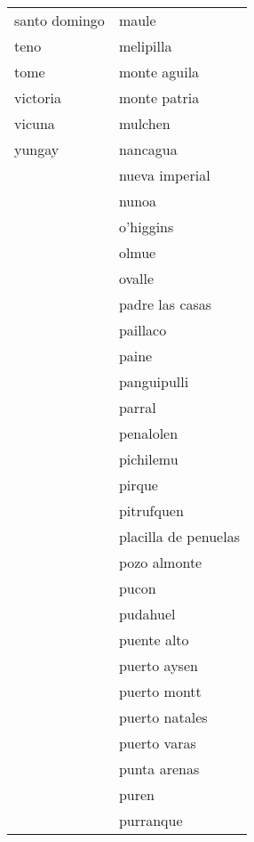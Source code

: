 \begin{longtable}{l|l}
                   santo domingo   &    maule   \\   
                   teno   &    melipilla   \\   
                   tome   &    monte aguila   \\   
                   victoria   &    monte patria   \\   
                   vicuna   &    mulchen   \\   
                yungay &    nancagua   \\   
                ~ &    nueva imperial   \\   
                ~ &    nunoa   \\   
                ~ &          o'higgins       \\   
                ~ &    olmue   \\   
                ~ &    ovalle   \\   
                ~ &    padre las casas   \\   
                ~ &    paillaco   \\   
                ~ &    paine   \\   
                ~ &    panguipulli   \\   
                ~ &    parral   \\   
                ~ &    penalolen   \\   
                ~ &    pichilemu   \\   
                ~ &    pirque   \\   
                ~ &    pitrufquen   \\   
                ~ &    placilla de penuelas   \\   
                ~ &    pozo almonte   \\   
                ~ &    pucon   \\   
                ~ &    pudahuel   \\   
                ~ &    puente alto   \\   
                ~ &    puerto aysen   \\   
                ~ &    puerto montt   \\   
                ~ &    puerto natales   \\   
                ~ &    puerto varas   \\   
                ~ &    punta arenas   \\   
                ~ &    puren   \\   
                ~ &    purranque   \\   

\end{longtable}
